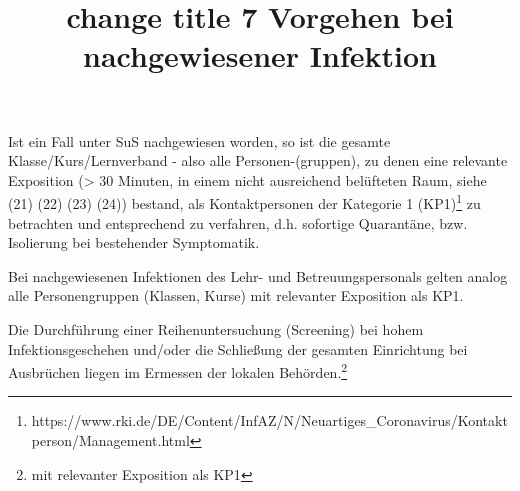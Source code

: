 \documentclass{article}
\begin{document}
\title{change title 7 Vorgehen bei nachgewiesener Infektion}

\maketitle


Ist ein Fall unter SuS nachgewiesen worden, so ist die gesamte Klasse/Kurs/Lernverband - also alle Personen-(gruppen), zu denen eine relevante Exposition (> 30 Minuten, in einem nicht ausreichend belüfteten Raum, siehe (21) (22) (23) (24)) bestand, als Kontaktpersonen der Kategorie 1 (KP1)\footnote{https://www.rki.de/DE/Content/InfAZ/N/Neuartiges\_Coronavirus/Kontaktperson/Management.html} zu betrachten und entsprechend zu verfahren, d.h. sofortige Quarantäne, bzw. Isolierung bei bestehender Symptomatik. 


Bei nachgewiesenen Infektionen des Lehr- und Betreuungspersonals gelten analog alle Personengruppen (Klassen, Kurse) mit relevanter Exposition als KP1. 


Die Durchführung einer Reihenuntersuchung (Screening) bei hohem Infektionsgeschehen und/oder die Schließung der gesamten Einrichtung bei Ausbrüchen liegen im Ermessen der lokalen Behörden.\footnote{mit relevanter Exposition als KP1}
\end{document}

